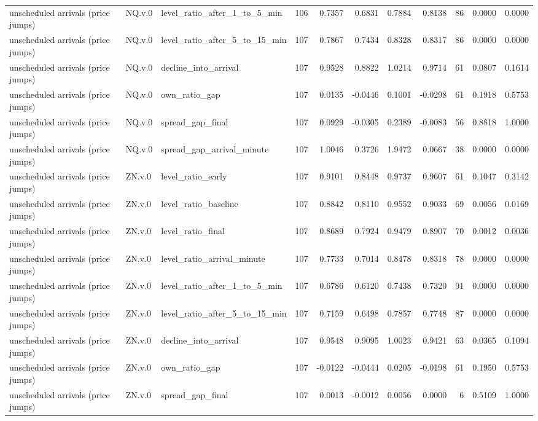 \begin{tabular}{lllrrrrrrrr}
unscheduled arrivals (price jumps) & NQ.v.0 & level_ratio_after_1_to_5_min & 106 & 0.7357 & 0.6831 & 0.7884 & 0.8138 & 86 & 0.0000 & 0.0000 \\
unscheduled arrivals (price jumps) & NQ.v.0 & level_ratio_after_5_to_15_min & 107 & 0.7867 & 0.7434 & 0.8328 & 0.8317 & 86 & 0.0000 & 0.0000 \\
unscheduled arrivals (price jumps) & NQ.v.0 & decline_into_arrival & 107 & 0.9528 & 0.8822 & 1.0214 & 0.9714 & 61 & 0.0807 & 0.1614 \\
unscheduled arrivals (price jumps) & NQ.v.0 & own_ratio_gap & 107 & 0.0135 & -0.0446 & 0.1001 & -0.0298 & 61 & 0.1918 & 0.5753 \\
unscheduled arrivals (price jumps) & NQ.v.0 & spread_gap_final & 107 & 0.0929 & -0.0305 & 0.2389 & -0.0083 & 56 & 0.8818 & 1.0000 \\
unscheduled arrivals (price jumps) & NQ.v.0 & spread_gap_arrival_minute & 107 & 1.0046 & 0.3726 & 1.9472 & 0.0667 & 38 & 0.0000 & 0.0000 \\
unscheduled arrivals (price jumps) & ZN.v.0 & level_ratio_early & 107 & 0.9101 & 0.8448 & 0.9737 & 0.9607 & 61 & 0.1047 & 0.3142 \\
unscheduled arrivals (price jumps) & ZN.v.0 & level_ratio_baseline & 107 & 0.8842 & 0.8110 & 0.9552 & 0.9033 & 69 & 0.0056 & 0.0169 \\
unscheduled arrivals (price jumps) & ZN.v.0 & level_ratio_final & 107 & 0.8689 & 0.7924 & 0.9479 & 0.8907 & 70 & 0.0012 & 0.0036 \\
unscheduled arrivals (price jumps) & ZN.v.0 & level_ratio_arrival_minute & 107 & 0.7733 & 0.7014 & 0.8478 & 0.8318 & 78 & 0.0000 & 0.0000 \\
unscheduled arrivals (price jumps) & ZN.v.0 & level_ratio_after_1_to_5_min & 107 & 0.6786 & 0.6120 & 0.7438 & 0.7320 & 91 & 0.0000 & 0.0000 \\
unscheduled arrivals (price jumps) & ZN.v.0 & level_ratio_after_5_to_15_min & 107 & 0.7159 & 0.6498 & 0.7857 & 0.7748 & 87 & 0.0000 & 0.0000 \\
unscheduled arrivals (price jumps) & ZN.v.0 & decline_into_arrival & 107 & 0.9548 & 0.9095 & 1.0023 & 0.9421 & 63 & 0.0365 & 0.1094 \\
unscheduled arrivals (price jumps) & ZN.v.0 & own_ratio_gap & 107 & -0.0122 & -0.0444 & 0.0205 & -0.0198 & 61 & 0.1950 & 0.5753 \\
unscheduled arrivals (price jumps) & ZN.v.0 & spread_gap_final & 107 & 0.0013 & -0.0012 & 0.0056 & 0.0000 & 6 & 0.5109 & 1.0000 \\

\end{tabular}
